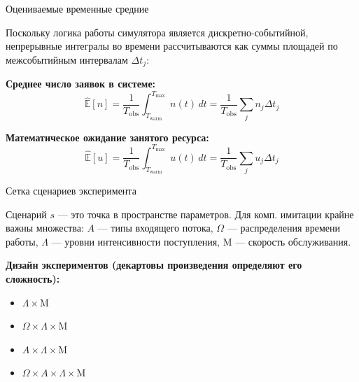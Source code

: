 \documentclass[aspectratio=169,12pt]{beamer}
\begin{document}
\begin{frame}{Оцениваемые временные средние}

Поскольку логика работы симулятора является дискретно-событийной, непрерывные интегралы во времени рассчитываются как суммы площадей по межсобытийным интервалам $\Delta t_j$:

\vspace{0.3cm}

\textbf{Среднее число заявок в системе:}
\[
\widehat{\mathbb{E}}[n] = \frac{1}{T_{\mathrm{obs}}} \int_{T_{\mathrm{warm}}}^{T_{\max}} n(t)\,dt = \frac{1}{T_{\mathrm{obs}}} \sum_{j} n_j \Delta t_j
\]

\vspace{0.4cm}

\textbf{Математическое ожидание занятого ресурса:}
\[
\widehat{\mathbb{E}}[u] = \frac{1}{T_{\mathrm{obs}}} \int_{T_{\mathrm{warm}}}^{T_{\max}} u(t)\,dt = \frac{1}{T_{\mathrm{obs}}} \sum_{j} u_{j} \Delta t_j
\]

\end{frame}
\begin{frame}{Сетка сценариев эксперимента}

Сценарий $s$ — это точка в пространстве параметров. Для комп. имитации крайне важны множества:
$A$ — типы входящего потока, $\Omega$ — распределения времени работы, 
$\Lambda$ — уровни интенсивности поступления, $\mathrm{M}$ — скорость обслуживания.

\vspace{0.2cm}
\textbf{Дизайн экспериментов (декартовы произведения определяют его сложность):}
\begin{itemize}
    \item {} \quad $\Lambda \times \mathrm{M}$
    \item {} \quad $\Omega \times \Lambda \times \mathrm{M}$
    \item {} \quad $A \times \Lambda \times \mathrm{M}$
    \item {} \quad $\Omega \times A \times \Lambda \times \mathrm{M}$
\end{itemize}

\end{frame}
\end{document}
